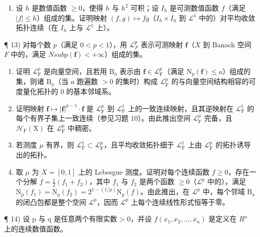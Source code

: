 \begin{enumerate}
\def\labelenumi{\arabic{enumi})}
\setcounter{enumi}{11}
\tightlist
\item
  设 \(h\) 是数值函数 \(\geqslant 0\)，使得 \(h\) 与 \(h^2\) 可积；设 \(I_h\) 是可测数值函数 \(f\)（满足 \(|f| \leqslant h\)）组成的集。证明映射 \((f, g) \mapsto fg\)（\(I_h \times I_h\) 到 \(\mathcal{L}^1\) 中的）对平均收敛拓扑连续（在 \(I_h\) 上与 \(\mathcal{L}^1\) 上）。
\end{enumerate}

¶ 13) 对每个数 \(p\)（满足 \(0 < p < 1\)），用 \(\mathcal{L}_F^p\) 表示可测映射 \(\mathbf{f}\)（\(X\) 到 Banach 空间 \(F\) 中的，满足 \(N sub p(\mathbf{f}) < +\infty\)）组成的集。

\begin{enumerate}
\def\labelenumi{\alph{enumi})}
\item
  证明 \(\mathcal{L}_{\mathrm{F}}^{p}\) 是向量空间，且若用 \(\mathrm{B}_a\) 表示由 \(\mathbf{f} \in \mathcal{L}_{\mathrm{F}}^{p}\)（满足 \(\mathrm{N}_p(\mathbf{f}) \leqslant a\)）组成的集，则诸 \(\mathrm{B}_a\)（当 \(a\) 跑遍数 \(>0\) 的集时）构成 \(\mathcal{L}_{\mathrm{F}}^{p}\) 的与向量空间结构相容的可度量化拓扑的 0 的基本邻域系。
\item
  证明映射 \(\mathbf{f} \mapsto |\mathbf{f}|^{p-1} \cdot \mathbf{f}\) 是 \(\mathcal{L}_{\mathrm{F}}^{p}\) 到 \(\mathcal{L}_{\mathrm{F}}^{1}\) 上的一致连续映射，且其逆映射在 \(\mathcal{L}_{\mathrm{F}}^{1}\) 的每个有界子集上一致连续（参见习题 10）。由此推出空间 \(\mathcal{L}_{\mathrm{F}}^{p}\) 完备，且 \(\mathcal{H}_{\mathrm{F}}(\mathrm{X})\) 在 \(\mathcal{L}_{\mathrm{F}}^{p}\) 中稠密。
\item
  若测度 \(\mu\) 有界，则 \(\mathcal{L}_{\mathrm{F}}^{1} \subset \mathcal{L}_{\mathrm{F}}^{p}\)，且平均收敛拓扑细于 \(\mathcal{L}_{\mathrm{F}}^{1}\) 上由 \(\mathcal{L}_{\mathrm{F}}^{p}\) 的拓扑诱导出的拓扑。
\item
  取 \(\mu\) 为 \(X = [0,1]\) 上的 Lebesgue 测度。证明对每个连续函数 \(f \geqslant 0\)，存在一个分解 \(f = \frac{1}{2}(f_1 + f_2)\)，其中 \(f_1\) 与 \(f_2\) 是两个函数 \(\geqslant 0\)（\(\mathcal{L}^p\) 中的），满足 \(\mathrm{N}_p(f_1) = \mathrm{N}_p(f_2) = 2^{1 - (1/p)}\mathrm{N}_p(f)\)。由此推出，在 \(\mathcal{L}^p\) 中，每个邻域 \(\mathrm{B}_a\) 的闭凸包都是整个空间 \(\mathcal{L}^p\)，因而 \(\mathcal{L}^p\) 上每个连续线性形式恒等于零。
\end{enumerate}

¶ 14) 设 p 与 q 是任意两个有限实数 \textgreater{} 0，并设 \(f(x_{1}, x_{2}, \ldots, x_{n})\) 是定义在 \(R^{n}\) 上的连续数值函数。

